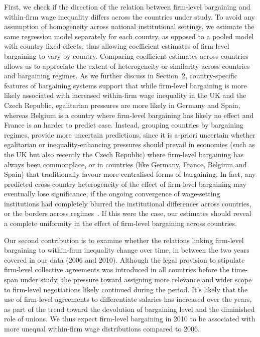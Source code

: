 \documentclass[12pt]{article}
\begin{document}
First, we check if the direction of the relation between firm-level bargaining and within-firm wage inequality differs across the countries under study. To avoid any assumption of homogeneity across national institutional settings, we estimate the same regression model separately for each country, as opposed to a pooled model with country fixed-effects, thus allowing coefficient estimates of firm-level bargaining to vary by country. Comparing coefficient estimates across countries allows us to appreciate the extent of heterogeneity or similarity across countries and bargaining regimes. As we further discuss in Section~2, country-specific features of bargaining systems support that while firm-level bargaining is more likely associated with increased within-firm wage inequality in the UK and the Czech Republic, egalitarian pressures are more likely in Germany and Spain, whereas Belgium is a country where firm-level bargaining has likely no effect and France is an harder to predict case.
Instead, grouping countries by bargaining regimes, provide more uncertain predictions, since it is a-priori uncertain whether egalitarian or inequality-enhancing pressures should prevail in economies (such as the UK but also recently the Czech Republic) where firm-level bargaining has always been commonplace, or in countries (like Germany, France, Belgium and Spain) that traditionally favour more centralised forms of bargaining.
In fact, any predicted cross-country heterogeneity of the effect of firm-level bargaining may eventually lose significance, if the ongoing convergence of wage-setting institutions had completely blurred the institutional differences across countries, or the borders across regimes~\citep[see][]{baccaro2017trajectories}.
If this were the case, our estimates should reveal a complete uniformity in the effect of firm-level bargaining across countries. 


Our second contribution is to examine whether the relations linking firm-level bargaining to within-firm inequality change over time, in between the two years covered in our data (2006 and 2010). Although the legal provision to stipulate firm-level collective agreements was introduced in all countries before the time-span under study, the pressure toward assigning more relevance and wider scope to firm-level negotiations likely continued during the period. It's likely that the use of firm-level agreements to differentiate salaries has increased over the years, as part of the trend toward the devolution of bargaining level and the diminished role of unions. We thus expect firm-level bargaining in 2010 to be associated with more unequal within-firm wage distributions compared to 2006.
\end{document}
